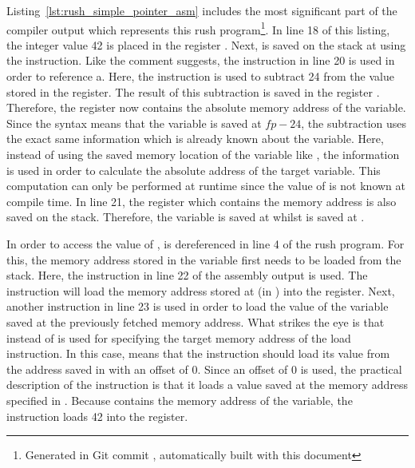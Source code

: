 Listing~\ref{lst:rush_simple_pointer_asm} includes the most significant part of the compiler output which represents this rush program\footnote{Generated in Git commit \rushCommit, automatically built with this document}.
In line 18 of this listing, the integer value 42 is placed in the register .
Next,  is saved on the stack at  using the  instruction.
Like the comment suggests, the instruction in line 20 is used in order to reference a.
Here, the  instruction is used to subtract 24 from the value stored in the  register.
The result of this subtraction is saved in the register .
Therefore, the register now contains the absolute memory address of the  variable.
Since the syntax  means that the variable is saved at $fp - 24$, the subtraction uses the exact same information which is already known about the variable.
Here, instead of using the saved memory location of the variable like , the information is used in order to calculate the absolute address of the target variable.
This computation can only be performed at runtime since the value of  is not known at compile time.
In line 21, the  register which contains the memory address is also saved on the stack.
Therefore, the  variable is saved at  whilst  is saved at .

In order to access the value of ,  is dereferenced in line 4 of the rush program.
For this, the memory address stored in the variable  first needs to be loaded from the stack.
Here, the  instruction in line 22 of the assembly output is used.
The instruction will load the memory address stored at  (in ) into the  register.
Next, another  instruction in line 23 is used in order to load the value of the variable saved at the previously fetched memory address.
What strikes the eye is that  instead of  is used for specifying the target memory address of the load instruction.
In this case,  means that the instruction should load its value from the address saved in  with an offset of 0.
Since an offset of 0 is used, the practical description of the instruction is that it loads a value saved at the memory address specified in .
Because  contains the memory address of the  variable, the instruction loads 42 into the  register.

